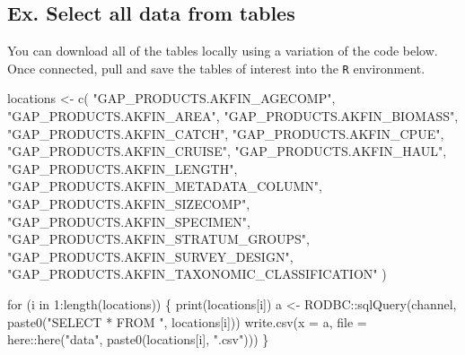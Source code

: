 \documentclass[
  letterpaper,
  oneside,
  open=any]{scrbook}
\newenvironment{Shaded}{\begin{snugshade}}{\end{snugshade}}
\newcommand{\AttributeTok}[1]{\textcolor[rgb]{0.40,0.45,0.13}{#1}}
\newcommand{\ControlFlowTok}[1]{\textcolor[rgb]{0.00,0.23,0.31}{#1}}
\newcommand{\DecValTok}[1]{\textcolor[rgb]{0.68,0.00,0.00}{#1}}
\newcommand{\FunctionTok}[1]{\textcolor[rgb]{0.28,0.35,0.67}{#1}}
\newcommand{\NormalTok}[1]{\textcolor[rgb]{0.00,0.23,0.31}{#1}}
\newcommand{\OtherTok}[1]{\textcolor[rgb]{0.00,0.23,0.31}{#1}}
\newcommand{\SpecialCharTok}[1]{\textcolor[rgb]{0.37,0.37,0.37}{#1}}
\newcommand{\StringTok}[1]{\textcolor[rgb]{0.13,0.47,0.30}{#1}}
\begin{document}
\hypertarget{ex.-select-all-data-from-tables}{%
\subsection{Ex. Select all data from
tables}\label{ex.-select-all-data-from-tables}}

You can download all of the tables locally using a variation of the code
below. Once connected, pull and save the tables of interest into the
\texttt{R} environment.

\begin{Shaded}
\begin{Highlighting}[]
\NormalTok{locations }\OtherTok{\textless{}{-}} \FunctionTok{c}\NormalTok{(}
  \StringTok{"GAP\_PRODUCTS.AKFIN\_AGECOMP"}\NormalTok{, }
  \StringTok{"GAP\_PRODUCTS.AKFIN\_AREA"}\NormalTok{, }
  \StringTok{"GAP\_PRODUCTS.AKFIN\_BIOMASS"}\NormalTok{, }
  \StringTok{"GAP\_PRODUCTS.AKFIN\_CATCH"}\NormalTok{, }
  \StringTok{"GAP\_PRODUCTS.AKFIN\_CPUE"}\NormalTok{, }
  \StringTok{"GAP\_PRODUCTS.AKFIN\_CRUISE"}\NormalTok{, }
  \StringTok{"GAP\_PRODUCTS.AKFIN\_HAUL"}\NormalTok{, }
  \StringTok{"GAP\_PRODUCTS.AKFIN\_LENGTH"}\NormalTok{, }
  \StringTok{"GAP\_PRODUCTS.AKFIN\_METADATA\_COLUMN"}\NormalTok{, }
  \StringTok{"GAP\_PRODUCTS.AKFIN\_SIZECOMP"}\NormalTok{, }
  \StringTok{"GAP\_PRODUCTS.AKFIN\_SPECIMEN"}\NormalTok{, }
  \StringTok{"GAP\_PRODUCTS.AKFIN\_STRATUM\_GROUPS"}\NormalTok{, }
  \StringTok{"GAP\_PRODUCTS.AKFIN\_SURVEY\_DESIGN"}\NormalTok{, }
  \StringTok{"GAP\_PRODUCTS.AKFIN\_TAXONOMIC\_CLASSIFICATION"}
\NormalTok{)}

\ControlFlowTok{for}\NormalTok{ (i }\ControlFlowTok{in} \DecValTok{1}\SpecialCharTok{:}\FunctionTok{length}\NormalTok{(locations)) \{}
  \FunctionTok{print}\NormalTok{(locations[i])}
\NormalTok{  a }\OtherTok{\textless{}{-}}\NormalTok{ RODBC}\SpecialCharTok{::}\FunctionTok{sqlQuery}\NormalTok{(channel, }\FunctionTok{paste0}\NormalTok{(}\StringTok{"SELECT * FROM "}\NormalTok{, locations[i]))}
  \FunctionTok{write.csv}\NormalTok{(}\AttributeTok{x =}\NormalTok{ a, }\AttributeTok{file =}\NormalTok{ here}\SpecialCharTok{::}\FunctionTok{here}\NormalTok{(}\StringTok{"data"}\NormalTok{, }\FunctionTok{paste0}\NormalTok{(locations[i], }\StringTok{".csv"}\NormalTok{)))}
\NormalTok{\}}
\end{Highlighting}
\end{Shaded}
\end{document}
